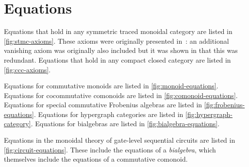 \section{Equations}
\label{app:equations}

Equations that hold in any symmetric traced monoidal category are listed in
\cref{fig:stmc-axioms}.
These axioms were originally presented in~\cite{joyal1996traced}: an additional
vanishing axiom was originally also included but it was shown in
\cite{hasegawa2009traced} that this was redundant.
Equations that hold in any compact closed category are listed in
\cref{fig:ccc-axioms}.

Equations for commutative monoids are listed in \cref{fig:monoid-equations}.
Equations for cocommutative comonoids are listed in \cref{fig:comonoid-equations}.
Equations for special commutative Frobenius algebras are listed in
\cref{fig:frobenius-equations}.
Equations for hypergraph categories are listed in \cref{fig:hypergraph-category}.
Equations for bialgebras are listed in \cref{fig:bialgebra-equations}.

Equations in the monoidal theory of gate-level sequential circuits are listed in
\cref{fig:circuit-equations}.
These include the equations of a \emph{bialgebra}, which themselves include the
equations of a commutative comonoid.








